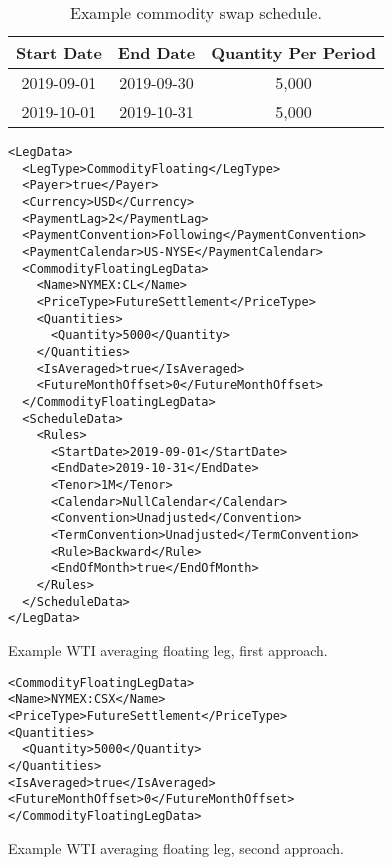 \begin{table}[h!]
\centering
  \begin{tabular}{|c|c|c|}
  \hline
  Start Date & End Date & Quantity Per Period \\
  \hline
  2019-09-01 & 2019-09-30 & 5,000 \\
  2019-10-01 & 2019-10-31 & 5,000 \\
  \hline
  \end{tabular}
\caption{Example commodity swap schedule.}
\label{tab:comm_ex_swap_schedule}
\end{table}

\begin{listing}[h!]
\begin{verbatim}
<LegData>
  <LegType>CommodityFloating</LegType>
  <Payer>true</Payer>
  <Currency>USD</Currency>
  <PaymentLag>2</PaymentLag>
  <PaymentConvention>Following</PaymentConvention>
  <PaymentCalendar>US-NYSE</PaymentCalendar>
  <CommodityFloatingLegData>
    <Name>NYMEX:CL</Name>
    <PriceType>FutureSettlement</PriceType>
    <Quantities>
      <Quantity>5000</Quantity>
    </Quantities>
    <IsAveraged>true</IsAveraged>
    <FutureMonthOffset>0</FutureMonthOffset>
  </CommodityFloatingLegData>
  <ScheduleData>
    <Rules>
      <StartDate>2019-09-01</StartDate>
      <EndDate>2019-10-31</EndDate>
      <Tenor>1M</Tenor>
      <Calendar>NullCalendar</Calendar>
      <Convention>Unadjusted</Convention>
      <TermConvention>Unadjusted</TermConvention>
      <Rule>Backward</Rule>
      <EndOfMonth>true</EndOfMonth>
    </Rules>
  </ScheduleData>
</LegData>
\end{verbatim}
\caption{Example WTI averaging floating leg, first approach.}
\label{lst:example_ave_floating_leg_1}
\end{listing}

\begin{listing}[h!]
\begin{verbatim}
<CommodityFloatingLegData>
<Name>NYMEX:CSX</Name>
<PriceType>FutureSettlement</PriceType>
<Quantities>
  <Quantity>5000</Quantity>
</Quantities>
<IsAveraged>true</IsAveraged>
<FutureMonthOffset>0</FutureMonthOffset>
</CommodityFloatingLegData>
\end{verbatim}
\caption{Example WTI averaging floating leg, second approach.}
\label{lst:example_ave_floating_leg_2}
\end{listing}
